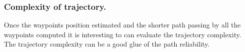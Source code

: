
 
\subsubsection{Complexity of trajectory. }\label{tarjectory}

Once the waypoints position estimated and the shorter path passing by all the waypoints computed it is interesting to can evaluate the trajectory complexity. The trajectory complexity can be a good glue of the path reliability.  
 
